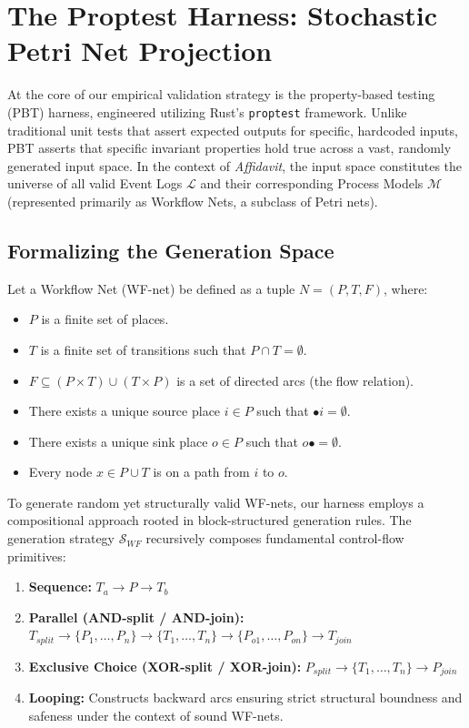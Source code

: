 \section{The Proptest Harness: Stochastic Petri Net Projection}

At the core of our empirical validation strategy is the property-based testing (PBT) harness, engineered utilizing Rust's \texttt{proptest} framework. Unlike traditional unit tests that assert expected outputs for specific, hardcoded inputs, PBT asserts that specific invariant properties hold true across a vast, randomly generated input space. In the context of \textit{Affidavit}, the input space constitutes the universe of all valid Event Logs $\mathcal{L}$ and their corresponding Process Models $\mathcal{M}$ (represented primarily as Workflow Nets, a subclass of Petri nets).

\subsection{Formalizing the Generation Space}

Let a Workflow Net (WF-net) be defined as a tuple $N = (P, T, F)$, where:
\begin{itemize}
    \item $P$ is a finite set of places.
    \item $T$ is a finite set of transitions such that $P \cap T = \emptyset$.
    \item $F \subseteq (P \times T) \cup (T \times P)$ is a set of directed arcs (the flow relation).
    \item There exists a unique source place $i \in P$ such that $\bullet i = \emptyset$.
    \item There exists a unique sink place $o \in P$ such that $o \bullet = \emptyset$.
    \item Every node $x \in P \cup T$ is on a path from $i$ to $o$.
\end{itemize}

To generate random yet structurally valid WF-nets, our harness employs a compositional approach rooted in block-structured generation rules. The generation strategy $\mathcal{S}_{WF}$ recursively composes fundamental control-flow primitives:
\begin{enumerate}
    \item \textbf{Sequence:} $T_a \rightarrow P \rightarrow T_b$
    \item \textbf{Parallel (AND-split / AND-join):} $T_{split} \rightarrow \{P_1, \dots, P_n\} \rightarrow \{T_1, \dots, T_n\} \rightarrow \{P_{o1}, \dots, P_{on}\} \rightarrow T_{join}$
    \item \textbf{Exclusive Choice (XOR-split / XOR-join):} $P_{split} \rightarrow \{T_1, \dots, T_n\} \rightarrow P_{join}$
    \item \textbf{Looping:} Constructs backward arcs ensuring strict structural boundness and safeness under the context of sound WF-nets.
\end{enumerate}

